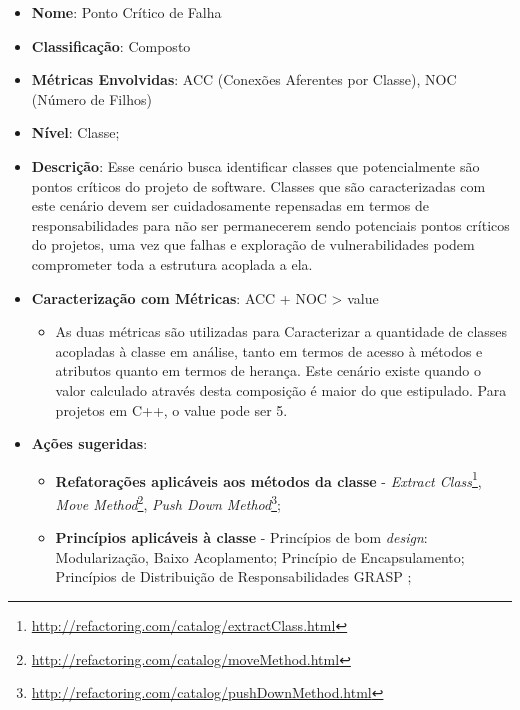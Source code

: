 \begin{itemize}
\item \textbf{Nome}: Ponto Crítico de Falha
\item \textbf{Classificação}: Composto
\item \textbf{Métricas Envolvidas}: ACC (Conexões Aferentes por Classe), NOC (Número de Filhos)
\item \textbf{Nível}: Classe;
\item \textbf{Descrição}: Esse cenário busca identificar classes que potencialmente são pontos críticos do projeto de software. Classes que são caracterizadas com este cenário devem ser cuidadosamente repensadas em termos de responsabilidades para não ser permanecerem sendo potenciais pontos críticos do projetos, uma vez que falhas e exploração de vulnerabilidades podem comprometer toda a estrutura acoplada a ela.
\item \textbf{Caracterização com Métricas}: ACC + NOC > value
	\begin{itemize}
	\item As duas métricas são utilizadas para Caracterizar a quantidade de classes acopladas à classe em análise, tanto em termos de acesso à métodos e atributos quanto em termos de herança. Este cenário existe quando o valor calculado através desta composição é maior do que estipulado. Para projetos em C++, o value pode ser 5.
	\end{itemize}
\item \textbf{Ações sugeridas}: 
	\begin{itemize}
	\item \textbf{Refatorações aplicáveis aos métodos da classe} - \emph{Extract Class}\footnote{\url{http://refactoring.com/catalog/extractClass.html}}, \emph{Move Method}\footnote{\url{http://refactoring.com/catalog/moveMethod.html}}, \emph{Push Down Method}\footnote{\url{http://refactoring.com/catalog/pushDownMethod.html}};
	\item \textbf{Princípios aplicáveis à classe} - Princípios de bom \emph{design}: Modularização, Baixo Acoplamento; Princípio de Encapsulamento; Princípios de Distribuição de Responsabilidades GRASP \cite{larman2007};
	\end{itemize}
\end{itemize}



%	


